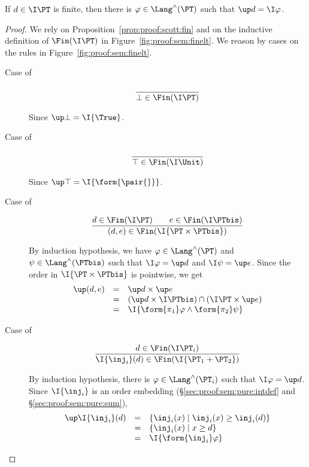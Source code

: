 \begin{lemma}
\label{lem:proof:sem:coprime-open:fin}
If $d \in \I\PT$ is finite,
then there is
$\varphi \in \Lang^\land(\PT)$
such that $\up d = \I\varphi$.
\end{lemma}


\begin{proof}
We rely on Proposition~\ref{prop:proof:scott:fin}
and on the inductive definition of $\Fin(\I\PT)$ in Figure~\ref{fig:proof:sem:finelt}.
We reason by cases on the rules 
in Figure~\ref{fig:proof:sem:finelt}.
\begin{description}
\item[Case of]
\[
\dfrac{}
  {\bot \in \Fin(\I\PT)}  
\]

\noindent
Since $\up \bot = \I{\True}$.

\item[Case of]
\[
\dfrac{}
  {\top \in \Fin(\I\Unit)}
\]

\noindent
Since $\up \top = \I{\form{\pair{}}}$.

\item[Case of]
\[
\dfrac{d \in \Fin(\I\PT)
  \qquad
  e \in \Fin(\I\PTbis)}
  {(d,e) \in \Fin(\I{\PT \times \PTbis})}
\]

\noindent
By induction hypothesis, we
have $\varphi \in \Lang^\land(\PT)$
and $\psi \in \Lang^\land(\PTbis)$
such that
$\I\varphi = \up d$
and
$\I\psi = \up e$.
Since the order in $\I{\PT \times \PTbis}$
is pointwise, we get
\[
\begin{array}{l l l}
  \up(d,e)
& =
& \up d \times \up e
\\
%
& =
& (\up d \times \I\PTbis)
  \cap
  (\I\PT \times \up e)
\\
%
& =
& \I{\form{\pi_1}\varphi \land \form{\pi_2}\psi}
\end{array}
\]

\item[Case of]
\[
\dfrac{d \in \Fin(\I\PT_i)}
  {\I{\inj_i}(d) \in \Fin(\I{\PT_1 + \PT_2})}
\]

By induction hypothesis, there is
$\varphi \in \Lang^\land(\PT_i)$
such that $\I\varphi = \up d$.
Since $\I{\inj_i}$ is an order embedding
(\S\ref{sec:proof:sem:pure:intdef} and \S\ref{sec:proof:sem:pure:sum}),
\[
\begin{array}{l l l}
  \up \I{\inj_i}(d)
& =
& \left\{
  \inj_i(x) \mid \inj_i(x) \geq \inj_i(d)
  \right\}
\\
%
& =
& \left\{
  \inj_i(x) \mid x \geq d
  \right\}
\\
%
& =
& \I{\form{\inj_i}\varphi}
\end{array}
\]


\end{description}
\end{proof}
